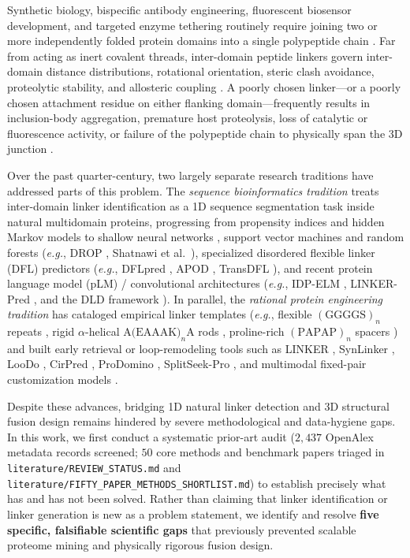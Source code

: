 \documentclass[11pt]{article}
\begin{document}
Synthetic biology, bispecific antibody engineering, fluorescent biosensor development, and targeted enzyme tethering routinely require joining two or more independently folded protein domains into a single polypeptide chain \cite{chen2013fusion,vanrosmalen2017gs,pedelacq2006sfgfp}. Far from acting as inert covalent threads, inter-domain peptide linkers govern inter-domain distance distributions, rotational orientation, steric clash avoidance, proteolytic stability, and allosteric coupling \cite{george2002analysis,arai2001helical,mcbride2026pose}. A poorly chosen linker---or a poorly chosen attachment residue on either flanking domain---frequently results in inclusion-body aggregation, premature host proteolysis, loss of catalytic or fluorescence activity, or failure of the polypeptide chain to physically span the 3D junction \cite{chen2013fusion,hubbard1994proteolysis}.

Over the past quarter-century, two largely separate research traditions have addressed parts of this problem. The \emph{sequence bioinformatics tradition} treats inter-domain linker identification as a 1D sequence segmentation task inside natural multidomain proteins, progressing from propensity indices and hidden Markov models \cite{george2002analysis,bae2005hmm} to shallow neural networks \cite{miyazaki2006neural}, support vector machines and random forests (\emph{e.g.}, DROP \cite{ebina2011drop}, Shatnawi et al.\ \cite{shatnawi2014rf}), specialized disordered flexible linker (DFL) predictors (\emph{e.g.}, DFLpred \cite{meng2016dflpred}, APOD \cite{peng2020apod}, TransDFL \cite{wu2023transdfl}), and recent protein language model (pLM) / convolutional architectures (\emph{e.g.}, IDP-ELM \cite{idp_elm2024}, LINKER-Pred \cite{linkerpred2025}, and the DLD framework \cite{dld2026jmb}). In parallel, the \emph{rational protein engineering tradition} has cataloged empirical linker templates (\emph{e.g.}, flexible $(\text{GGGGS})_n$ repeats \cite{vanrosmalen2017gs}, rigid $\alpha$-helical $\text{A(EAAAK)}_n\text{A}$ rods \cite{arai2001helical}, proline-rich $(\text{PAPAP})_n$ spacers \cite{chen2013fusion}) and built early retrieval or loop-remodeling tools such as LINKER \cite{crasto2000linker}, SynLinker \cite{liu2015synlinker}, LooDo \cite{berrondo2018loodo}, CirPred \cite{chen2021cirpred}, ProDomino \cite{wolf2025prodomino}, SplitSeek-Pro \cite{wang2026splitseek}, and multimodal fixed-pair customization models \cite{li2026multimodal}.

Despite these advances, bridging 1D natural linker detection and 3D structural fusion design remains hindered by severe methodological and data-hygiene gaps. In this work, we first conduct a systematic prior-art audit ($2{,}437$ OpenAlex metadata records screened; $50$ core methods and benchmark papers triaged in \texttt{literature/REVIEW\_STATUS.md} and \texttt{literature/FIFTY\_PAPER\_METHODS\_SHORTLIST.md}) to establish precisely what has and has not been solved. Rather than claiming that linker identification or linker generation is new as a problem statement, we identify and resolve \textbf{five specific, falsifiable scientific gaps} that previously prevented scalable proteome mining and physically rigorous fusion design.
\end{document}
